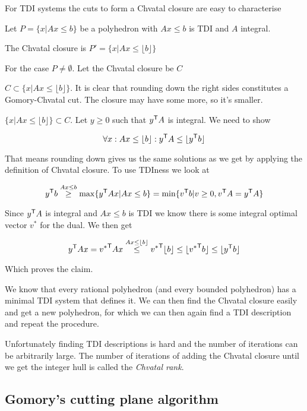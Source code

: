 For TDI systems the cuts to form a Chvatal closure are easy to characterise

\begin{thm} Let $P=\{x|Ax\leq b\}$ be a polyhedron with $Ax\leq b$ is TDI and $A$ integral. 

The Chvatal closure is $P'=\{x|Ax\leq \lfloor b\rfloor\}$
\end{thm}

\begin{pr}[]For the case $P\neq \emptyset$. Let the Chvatal closure be $C$

$C\subset \{x|Ax\leq \lfloor b\rfloor\}$. It is clear that rounding down the right sides constitutes a Gomory-Chvatal cut. The closure may have some more, so it's smaller.

$\{x|Ax\leq \lfloor b\rfloor\} \subset C$. Let $y\geq 0$ such that ${y}^\text{\upshape \sffamily T} A$ is integral. We need to show 

\[\forall x: Ax\leq \lfloor b \rfloor: {y}^\text{\upshape \sffamily T} A \leq \lfloor {y}^\text{\upshape \sffamily T} b\rfloor\]

That means rounding down gives us the same solutions as we get by applying the definition of Chvatal closure. To use TDIness we look at

\[{y}^\text{\upshape \sffamily T}b \stackrel{Ax\leq b}{\geq} \max \{{y}^\text{\upshape \sffamily T} Ax | Ax\leq b\} = \min \{{v}^\text{\upshape \sffamily T} b|v\geq 0, {v}^\text{\upshape \sffamily T} A = {y}^\text{\upshape \sffamily T} A\}\]

Since ${y}^\text{\upshape \sffamily T} A$ is integral and $Ax\leq b$ is TDI we know there is some integral optimal vector $v^*$ for the dual. We then get

\[{y}^\text{\upshape \sffamily T} A x ={v^*}^\text{\upshape \sffamily T} A x \stackrel{Ax\leq \lfloor b\rfloor}{\leq} {v^*}^\text{\upshape \sffamily T} \lfloor b\rfloor \leq \lfloor {v^*}^\text{\upshape \sffamily T} b\rfloor \leq \lfloor {y}^\text{\upshape \sffamily T} b\rfloor\]

Which proves the claim.
\end{pr}

We know that every rational polyhedron (and every bounded polyhedron) has a minimal TDI system that defines it. We can then find the Chvatal closure easily and get a new polyhedron, for which we can then again find a TDI description and repeat the procedure.

Unfortunately finding TDI descriptions is hard and the number of iterations can be arbitrarily large. The number of iterations of adding the Chvatal closure until we get the integer hull is called the \emph{Chvatal rank}.

\subsection{Gomory's cutting plane algorithm}

